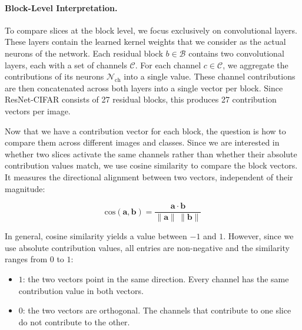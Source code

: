 \documentclass[
12pt,
fancyheadings,
a4paper,
twoside,
BCOR=0.7cm,
nobcorignoretitle,
grayscalebody,
]{stsreprt}
\begin{document}
\paragraph{Block-Level Interpretation.}
To compare slices at the block level, we focus exclusively on convolutional layers.
These layers contain the learned kernel weights that we consider as the actual neurons of the
network.
Each residual block $b \in \mathcal{B}$ contains two convolutional layers, each with a set of
channels $\mathcal{C}$.
For each channel $c \in \mathcal{C}$, we aggregate the contributions of its neurons
$\mathcal{N}_{\text{ch}}$ into a single value.
These channel contributions are then concatenated across both layers into a single vector per
block.
Since ResNet-CIFAR consists of 27 residual blocks, this produces 27 contribution vectors per image.

Now that we have a contribution vector for each block, the question is how to compare them across
different images and classes.
Since we are interested in whether two slices activate the same channels rather than whether their
absolute contribution values match, we use cosine similarity to compare the block vectors.
It measures the directional alignment between two vectors, independent of their magnitude:

\[
\text{cos}(\mathbf{a}, \mathbf{b}) = \frac{\mathbf{a} \cdot \mathbf{b}}{\|\mathbf{a}\| \, \|\mathbf{b}\|}
\]

In general, cosine similarity yields a value between $-1$ and $1$.
However, since we use absolute contribution values, all entries are non-negative and the similarity
ranges from $0$ to $1$:

\begin{itemize}
    \item $1$: the two vectors point in the same direction. Every channel has the same contribution value in both vectors.
    \item $0$: the two vectors are orthogonal. The channels that contribute to one slice do not contribute to the other.
\end{itemize}
\end{document}
